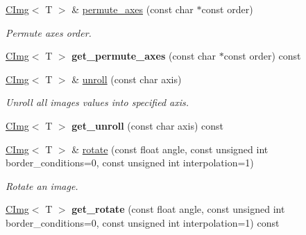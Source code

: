 \begin{DoxyCompactItemize}
\item 
\hyperlink{structcimg__library_1_1CImg}{CImg}$<$ T $>$ \& \hyperlink{structcimg__library_1_1CImg_a2e2474724012ff35f4934fe69eadb2a7}{permute\_\-axes} (const char $\ast$const order)
\begin{DoxyCompactList}\small\item\em Permute axes order. \item\end{DoxyCompactList}\item 
\hypertarget{structcimg__library_1_1CImg_a52f1bffa4d4d1d356d077c86126194bb}{
\hyperlink{structcimg__library_1_1CImg}{CImg}$<$ T $>$ {\bfseries get\_\-permute\_\-axes} (const char $\ast$const order) const }
\label{structcimg__library_1_1CImg_a52f1bffa4d4d1d356d077c86126194bb}

\item 
\hypertarget{structcimg__library_1_1CImg_a6f2a337d1eb6c94217167dd9296890f3}{
\hyperlink{structcimg__library_1_1CImg}{CImg}$<$ T $>$ \& \hyperlink{structcimg__library_1_1CImg_a6f2a337d1eb6c94217167dd9296890f3}{unroll} (const char axis)}
\label{structcimg__library_1_1CImg_a6f2a337d1eb6c94217167dd9296890f3}

\begin{DoxyCompactList}\small\item\em Unroll all images values into specified axis. \item\end{DoxyCompactList}\item 
\hypertarget{structcimg__library_1_1CImg_a0d9c7fb0da448c7615d82755b9a17f9b}{
\hyperlink{structcimg__library_1_1CImg}{CImg}$<$ T $>$ {\bfseries get\_\-unroll} (const char axis) const }
\label{structcimg__library_1_1CImg_a0d9c7fb0da448c7615d82755b9a17f9b}

\item 
\hyperlink{structcimg__library_1_1CImg}{CImg}$<$ T $>$ \& \hyperlink{structcimg__library_1_1CImg_aa554fa784735e23a870e4cc026b3f8dd}{rotate} (const float angle, const unsigned int border\_\-conditions=0, const unsigned int interpolation=1)
\begin{DoxyCompactList}\small\item\em Rotate an image. \item\end{DoxyCompactList}\item 
\hypertarget{structcimg__library_1_1CImg_ae5c52b3a9ad007815bb8531b66884de5}{
\hyperlink{structcimg__library_1_1CImg}{CImg}$<$ T $>$ {\bfseries get\_\-rotate} (const float angle, const unsigned int border\_\-conditions=0, const unsigned int interpolation=1) const }
\label{structcimg__library_1_1CImg_ae5c52b3a9ad007815bb8531b66884de5}


\end{DoxyCompactItemize}
